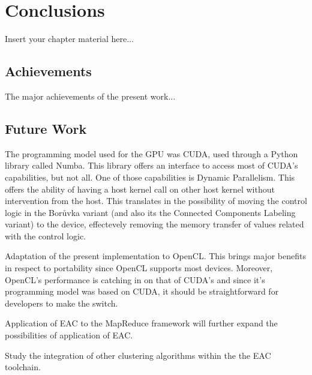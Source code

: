 
\chapter{Conclusions}
\label{chapter:conclusions}

Insert your chapter material here...


\section{Achievements}
\label{section:achievements}

The major achievements of the present work...


\section{Future Work}
\label{section:future}

The programming model used for the GPU was CUDA, used through a Python library called Numba.
This library offers an interface to access most of CUDA's capabilities, but not all.
One of those capabilities is Dynamic Parallelism.
This offers the ability of having a host kernel call on other host kernel without intervention from the host.
This translates in the possibility of moving the control logic in the Borůvka variant (and also its the Connected Components Labeling variant) to the device, effectevely removing the memory transfer of values related with the control logic.

Adaptation of the present implementation to OpenCL. This brings major benefits in respect to portability since OpenCL supports most devices. Moreover, OpenCL's performance is catching in on that of CUDA's and since it's programming model was based on CUDA, it should be straightforward for developers to make the switch.

Application of EAC to the MapReduce framework will further expand the possibilities of application of EAC.

Study the integration of other clustering algorithms within the the EAC toolchain.


\cleardoublepage

